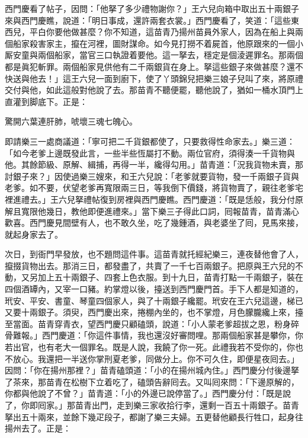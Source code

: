 西門慶看了帖子，因問：「他拏了多少禮物謝你？」王六兒向箱中取出五十兩銀子來與西門慶瞧，說道：「明日事成，還許兩套衣裳。」西門慶看了，笑道：「這些東西兒，平白你要他做甚麼？你不知道，這苗青乃揚州苗員外家人，因為在船上與兩個船家殺害家主，攛在河裡，圖財謀命。如今見打撈不着屍首，他原跟來的一個小厮安童與兩個船家，當官三口執證着要他。這一拏去，穩定是個淩遲罪名。那兩個都是眞犯斬罪。兩個船家見供他有二千兩銀貨在身上。拏這些銀子來做甚麼？還不快送與他去！」這王六兒一面到廚下，使了丫頭錦兒把樂三娘子兒叫了來，將原禮交付與他，如此這般對他說了去。那苗青不聽便罷，聽他說了，猶如一桶水頂門上直灌到脚底下。正是：

\begin{myquote}
驚開六葉連肝肺，唬壞三魂七魄心。
\end{myquote}

即請樂三一處商議道：「寧可把二千貨銀都使了，只要救得性命家去。」樂三道：「如今老爹上邊既發此言，一些半些恆屬打不動。兩位官府，須得湊一千貨物與他。其餘節級、原解、緝捕，再得一半，纔得勾用。」苗青道：「況我貨物未賣，那討銀子來？」因使過樂三嫂來，和王六兒說：「老爹就要貨物，發一千兩銀子貨與老爹。如不要，伏望老爹再寬限兩三日，等我倒下價錢，將貨物賣了，親往老爹宅裡進禮去。」王六兒拏禮帖復到房裡與西門慶瞧。西門慶道：「既是恁般，我分付原解且寬限他幾日，教他即便進禮來。」當下樂三子得此口詞，囘報苗青，苗青滿心歡喜。西門慶見間壁有人，也不敢久坐，吃了幾鍾酒，與老婆坐了囘，見馬來接，就起身家去了。

次日，到衙門早發放，也不題問這件事。這苗青就托經紀樂三，連夜替他會了人，攛掇貨物出去。那消三日，都發盡了，共賣了一千七百兩銀子。把原與王六兒的不動，又另加上五十兩銀子、四套上色衣服。到十九日，苗青打點一千兩銀子，裝在四個酒罈內，又宰一口豬。約掌燈以後，擡送到西門慶門首。手下人都是知道的，玳安、平安、書童、琴童四個家人，與了十兩銀子纔罷。玳安在王六兒這邊，梯已又要十兩銀子。須臾，西門慶出來，捲棚內坐的，也不掌燈，月色朦朧纔上來，{}擡至當面。苗青穿青衣，望西門慶只顧磕頭，說道：「小人蒙老爹超拔之恩，粉身碎骨難報。」西門慶道：「你這件事情，我也還沒好審問哩。那兩個船家甚是攀你，你若出官，也有老大一個罪名。既是人說，我饒了你一死。此禮我若不受你的，你也不放心。我還把一半送你掌刑夏老爹，同做分上。你不可久住，即便星夜囘去。」因問：「你在揚州那裡？」苗青磕頭道：「小的在揚州城內住。」西門慶分付後邊拏了茶來，那苗青在松樹下立着吃了，磕頭告辭囘去。又叫囘來問：「下邊原解的，你都與他說了不曾？」苗青道：「小的外邊已說停當了。」西門慶分付：「既是說了，你即囘家。」那苗青出門，走到樂三家收拾行李，還剩一百五十兩銀子。苗青拏出五十兩來，並餘下幾疋段子，都謝了樂三夫婦。五更替他顧長行牲口，起身往揚州去了。正是：

